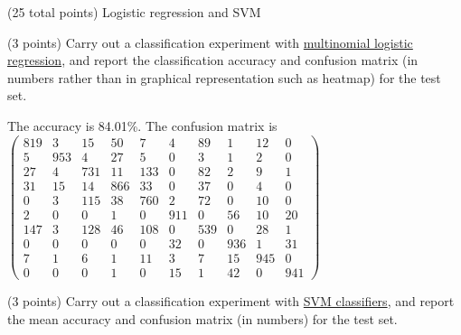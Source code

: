 \documentclass[12pt]{article}
\begin{document}
\begin{question}{(25 total points) Logistic regression and SVM}

  


  \medskip
   \begin{subquestion}{(3 points)
       Carry out a classification experiment with
       \href{https://scikit-learn.org/0.19/modules/generated/sklearn.linear\_model.LogisticRegression.html}{multinomial logistic regression},
       and report the classification accuracy and confusion matrix (in
       numbers rather than in graphical representation such as heatmap)
       for the test set.
     } \label{Q2.1}


   

      \begin{answerbox}{30em}
         The accuracy is 84.01\%. The confusion matrix is
\\ $\begin{pmatrix} 819 & 3 & 15 & 50 & 7 & 4 & 89 & 1 & 12 & 0\\
						 5 & 953 & 4 & 27 & 5 & 0 & 3 & 1 & 2 & 0\\
						 27 & 4 & 731 & 11 & 133 & 0 & 82 & 2 & 9 & 1\\
						 31 & 15 & 14 & 866 & 33 & 0 & 37 & 0 & 4 & 0\\
    					 0 & 3 & 115 & 38 & 760 & 2 & 72 & 0 & 10 & 0\\
						 2 & 0 & 0 & 1 & 0 & 911 & 0 & 56 & 10 & 20\\
						 147 & 3 & 128 & 46 & 108 & 0 & 539 & 0 & 28 & 1\\
						 0 & 0 & 0 & 0 & 0 & 32 & 0 & 936 & 1 & 31\\
					    7 & 1 & 6 & 1 & 11 & 3 & 7 & 15 & 945 & 0\\
						 0 & 0 & 0 & 1 & 0 & 15 & 1 & 42 & 0 & 941\end{pmatrix}$
      \end{answerbox}
  


   \end{subquestion}
   \begin{subquestion}{(3 points)
       Carry out a classification experiment with
       \href{https://scikit-learn.org/0.19/modules/generated/sklearn.svm.SVC.html}{SVM classifiers}, and report the
       mean accuracy and confusion matrix (in numbers) for the test
       set.
     } \label{Q2.2}



\end{subquestion}
\end{question}
\end{document}
